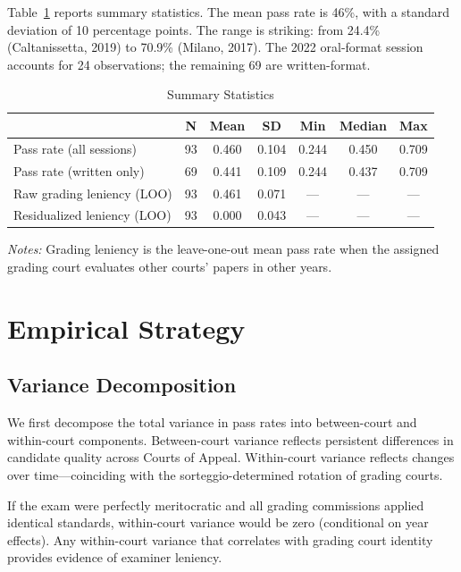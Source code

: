 \documentclass[11pt]{article}
\begin{document}
Table~\ref{tab:summary} reports summary statistics. The mean pass rate is 46\%, with a standard deviation of 10 percentage points. The range is striking: from 24.4\% (Caltanissetta, 2019) to 70.9\% (Milano, 2017). The 2022 oral-format session accounts for 24 observations; the remaining 69 are written-format.

\begin{table}[htbp]
\centering
\caption{Summary Statistics}
\label{tab:summary}
\begin{tabular}{lcccccc}
\toprule
& N & Mean & SD & Min & Median & Max \\
\midrule
Pass rate (all sessions) & 93 & 0.460 & 0.104 & 0.244 & 0.450 & 0.709 \\
Pass rate (written only) & 69 & 0.441 & 0.109 & 0.244 & 0.437 & 0.709 \\
Raw grading leniency (LOO) & 93 & 0.461 & 0.071 & --- & --- & --- \\
Residualized leniency (LOO) & 93 & 0.000 & 0.043 & --- & --- & --- \\
\bottomrule
\end{tabular}
\begin{minipage}{0.9\textwidth}
\footnotesize
\textit{Notes:} Grading leniency is the leave-one-out mean pass rate when the assigned grading court evaluates other courts' papers in other years.
\end{minipage}
\end{table}

\section{Empirical Strategy} \label{sec:strategy}

\subsection{Variance Decomposition}

We first decompose the total variance in pass rates into between-court and within-court components. Between-court variance reflects persistent differences in candidate quality across Courts of Appeal. Within-court variance reflects changes over time---coinciding with the sorteggio-determined rotation of grading courts.

If the exam were perfectly meritocratic and all grading commissions applied identical standards, within-court variance would be zero (conditional on year effects). Any within-court variance that correlates with grading court identity provides evidence of examiner leniency.
\end{document}
